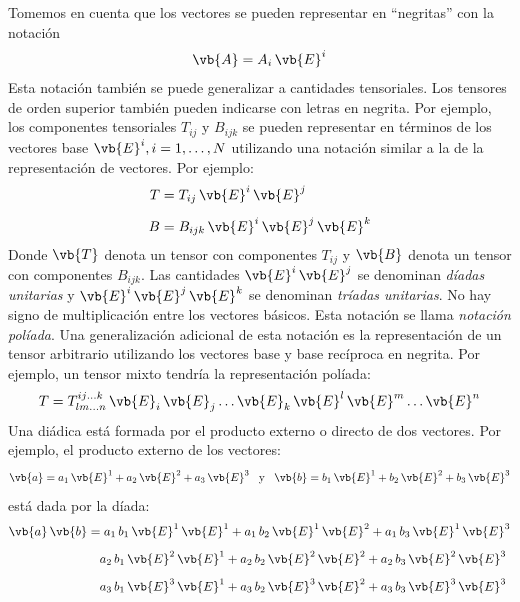Tomemos en cuenta que los vectores se pueden representar en \enquote{negritas} con la notación
\begin{align*}
\vb{A} = A_{i} \, \vb{E}^{i}
\end{align*}
Esta notación también se puede generalizar a cantidades tensoriales. Los tensores de orden superior también pueden indicarse con letras en negrita. Por ejemplo, los componentes tensoriales $T_{ij}$ y $B_{ijk}$ se pueden representar en términos de los vectores base 
$\vb{E}^{i}, i = 1, \ldots, N$ utilizando una notación similar a la de la representación de vectores. Por ejemplo:
\begin{align*}
T &= T_{ij} \, \vb{E}^{i} \, \vb{E}^{j} \\[0.5em]
B &= B_{ijk} \, \vb{E}^{i} \, \vb{E}^{j} \, \vb{E}^{k}
\end{align*}
Donde $\vb{T}$ denota un tensor con componentes $T_{ij}$ y $\vb{B}$ denota un tensor con componentes $B_{ijk}$. Las cantidades $\vb{E}^{i} \, \vb{E}^{j}$ se denominan \emph{díadas unitarias} y $\vb{E}^{i} \, \vb{E}^{j} \, \vb{E}^{k}$ se denominan \emph{tríadas unitarias}. No hay signo de multiplicación entre los vectores básicos. Esta notación se llama \emph{notación políada}. Una generalización adicional de esta notación es la representación de un tensor arbitrario utilizando los vectores base y base recíproca en negrita. Por ejemplo, un tensor mixto tendría la representación políada:
\begin{align*}
T = T_{l m \ldots n}^{i j \ldots k} \, \vb{E}_{i} \, \vb{E}_{j} \ldots \vb{E}_{k} \, \vb{E}^{l} \, \vb{E}^{m} \ldots \vb{E}^{n}
\end{align*}
Una diádica está formada por el producto externo o directo de dos vectores. Por ejemplo, el producto externo de los vectores:
\begin{align*}
\vb{a} = a_{1} \, \vb{E}^{1} + a_{2} \, \vb{E}^{2} + a_{3} \, \vb{E}^{3} \hspace{0.3cm} \mbox{y} \hspace{0.3cm} \vb{b} = b_{1} \, \vb{E}^{1} + b_{2} \, \vb{E}^{2} + b_{3} \, \vb{E}^{3}
\end{align*}
está dada por la díada:
\begin{align*}
\vb{a} \, \vb{b} &= a_{1} \, b_{1} \, \vb{E}^{1} \, \vb{E}^{1} + a_{1} \, b_{2} \, \vb{E}^{1} \, \vb{E}^{2} + a_{1} \, b_{3} \, \vb{E}^{1} \, \vb{E}^{3} \\[0.5em]  
&{\quad} a_{2} \, b_{1} \, \vb{E}^{2} \, \vb{E}^{1} + a_{2} \, b_{2} \, \vb{E}^{2} \, \vb{E}^{2} + a_{2} \, b_{3} \, \vb{E}^{2} \, \vb{E}^{3} \\[0.5em]
&{\quad} a_{3} \, b_{1} \, \vb{E}^{3} \, \vb{E}^{1} + a_{3} \, b_{2} \, \vb{E}^{3} \, \vb{E}^{2} + a_{3} \, b_{3} \, \vb{E}^{3} \, \vb{E}^{3}
\end{align*}

